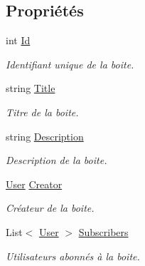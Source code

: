 \subsection*{Propriétés}
\begin{DoxyCompactItemize}
\item 
int \hyperlink{class_boxes_1_1_models_1_1_box_a6c7af8b2c2c4a76ea6af5f1235990d51}{Id}
\begin{DoxyCompactList}\small\item\em Identifiant unique de la boite. \end{DoxyCompactList}\item 
string \hyperlink{class_boxes_1_1_models_1_1_box_a74ccb7023557088f761d035260bb66f5}{Title}
\begin{DoxyCompactList}\small\item\em Titre de la boite. \end{DoxyCompactList}\item 
string \hyperlink{class_boxes_1_1_models_1_1_box_ab5b608a65148d5428899e34640e5fe75}{Description}
\begin{DoxyCompactList}\small\item\em Description de la boite. \end{DoxyCompactList}\item 
\hyperlink{class_boxes_1_1_models_1_1_user}{User} \hyperlink{class_boxes_1_1_models_1_1_box_a1130042cf626139cda10edc106be2bdd}{Creator}
\begin{DoxyCompactList}\small\item\em Créateur de la boite. \end{DoxyCompactList}\item 
List$<$ \hyperlink{class_boxes_1_1_models_1_1_user}{User} $>$ \hyperlink{class_boxes_1_1_models_1_1_box_a0673e580220c22c6b95ca05b3a800a65}{Subscribers}
\begin{DoxyCompactList}\small\item\em Utilisateurs abonnés à la boite. \end{DoxyCompactList}\end{DoxyCompactItemize}



